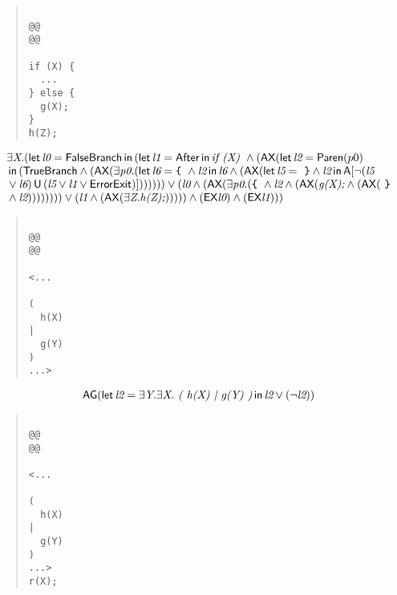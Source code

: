 \documentclass{article}
\newcommand{\U}{\,\mbox{\sf{U}}\,}
\newcommand{\A}{\mbox{\sf{A}}}
\newcommand{\AX}{\mbox{\sf{AX}}}
\newcommand{\EX}{\mbox{\sf{EX}}}
\newcommand{\AG}{\mbox{\sf{AG}}}
\newcommand{\mita}[1]{\mbox{\it{{#1}}}}
\newcommand{\msf}[1]{\mbox{\sf{{#1}}}}
\newcommand{\ttlb}{\mbox{\tt \char'173}}
\newcommand{\ttrb}{\mbox{\tt \char'175}}
\begin{document}
\begin{quote}\begin{verbatim}

@@
@@

if (X) {
  ...
} else {
  g(X);
}
h(Z);
\end{verbatim}\end{quote}

\[\begin{array}{l}
\exists \mita{X} . (\mita{\sf{let}} \, \mita{l0} = \msf{FalseBranch} \, \mita{\sf{in}} \, (\mita{\sf{let}} \, \mita{l1} = \msf{After} \, \mita{\sf{in}} \, \mita{if (X) } \wedge (\AX(\mita{\sf{let}} \, \mita{l2} = \msf{Paren}(p0)\\\mbox{} \, \mita{\sf{in}} \, (\msf{TrueBranch} \wedge (\AX(\exists \mita{p0} . (\mita{\sf{let}} \, \mita{l6} = \mita{{\ttlb}
  } \wedge \mita{l2} \, \mita{\sf{in}} \, \mita{l6} \wedge (\AX(\mita{\sf{let}} \, \mita{l5} = \mita{
{\ttrb}} \wedge \mita{l2} \, \mita{\sf{in}} \, \A[\neg (\mita{l5}\\\mbox{} \vee \mita{l6}) \U (\mita{l5} \vee \mita{l1} \vee \msf{ErrorExit})]

))
)))) \vee (\mita{l0} \wedge (\AX(\exists \mita{p0} . (\mita{{\ttlb}
  } \wedge \mita{l2} \wedge (\AX(\mita{g(X);} \wedge (\AX(\mita{
{\ttrb}}\\\mbox{} \wedge \mita{l2})))))))) \vee (\mita{l1} \wedge (\AX(\exists \mita{Z} . \mita{h(Z);})))
)) \wedge (\EX\mita{l0}) \wedge (\EX\mita{l1})
)
)
\end{array}\]

\begin{quote}\begin{verbatim}

@@
@@

<...
  
(
  h(X)
|
  g(Y)
)
...>
\end{verbatim}\end{quote}

\[\begin{array}{l}
\AG(\mita{\sf{let}} \, \mita{l2} = \exists \mita{Y} . \exists \mita{X} . \mita{
(
h(X)
|
g(Y)
)} \, \mita{\sf{in}} \, \mita{l2} \vee (\neg \mita{l2})
)
\end{array}\]

\begin{quote}\begin{verbatim}

@@
@@

<...
  
(
  h(X)
|
  g(Y)
)
...>
r(X);
\end{verbatim}\end{quote}
\end{document}
